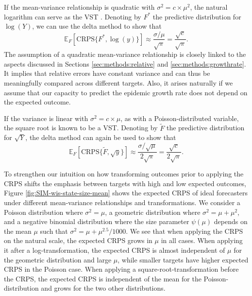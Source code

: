 \documentclass{article}
\begin{document}
If the mean-variance relationship is quadratic with $\sigma^2 = c \times \mu^2$, the natural logarithm can serve as the VST \citep{guerreroTimeseriesAnalysisSupported1993}. Denoting by $F^*$ the predictive distribution for $\log(Y)$, we can use the delta method to show that
$$
\mathbb{E}_F[\text{CRPS}\{F^*, \log(y)\}] \approx \frac{\sigma/\mu}{\sqrt{\pi}} 
= \frac{\sqrt{c}}{\sqrt{\pi}}
.
$$
The assumption of a quadratic mean-variance relationship is closely linked to the aspects discussed in Sections \ref{sec:methods:relative} and \ref{sec:methods:growthrate}. It implies that relative errors have constant variance and can thus be meaningfully compared across different targets. Also, it arises naturally if we assume that our capacity to predict the epidemic growth rate does not depend on the expected outcome.

If the variance is linear with $\sigma^2 = c \times \mu$, as with a Poisson-distributed variable, the square root is known to be a VST. Denoting by $\tilde{F}$ the predictive distribution for $\sqrt{Y}$, the delta method can again be used to show that
$$
\mathbb{E}_F[\text{CRPS}\{\tilde{F}, \sqrt{y}\}] \approx \frac{\sigma/\sqrt{\mu}}{2\sqrt{\pi}} = \frac{\sqrt{c}}{2\sqrt{\pi}}
.
$$


To strengthen our intuition on how transforming outcomes prior to applying the CRPS shifts the emphasis between targets with high and low expected outcomes, Figure \ref{fig:SIM-wis-state-size-mean} shows the expected CRPS of ideal forecasters under different mean-variance relationships and transformations. We consider a Poisson distribution where $\sigma^2 = \mu$, a geometric distribution where $\sigma^2 = \mu + \mu^2$, and a negative binomial distribution where the size parameter $\psi(\mu)$ depends on the mean $\mu$ such that $\sigma^2 = \mu + \mu^{2.5}/1000$. We see that when applying the CRPS on the natural scale, the expected CRPS grows in $\mu$ in all cases. When applying it after a log-transformation, the expected CRPS is almost independent of $\mu$ for the geometric distribution and large $\mu$, while smaller targets have higher expected CRPS in the Poisson case. When applying a square-root-transformation before the CRPS, the expected CRPS is independent of the mean for the Poisson-distribution and grows for the two other distributions. 
\end{document}

